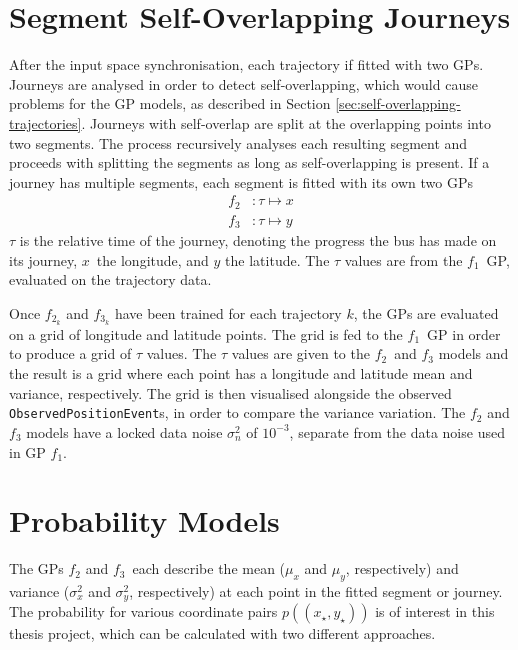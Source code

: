 \section{Segment Self-Overlapping Journeys} \label{sec:segment-self-overlapping-journeys}
After the input space synchronisation, each trajectory if fitted with two GPs.
Journeys are analysed in order to detect self-overlapping, which would cause problems for the GP models, as described in Section \ref{sec:self-overlapping-trajectories}.
Journeys with self-overlap are split at the overlapping points into two segments.
The process recursively analyses each resulting segment and proceeds with splitting the segments as long as self-overlapping is present.
If a journey has multiple segments, each segment is fitted with its own two GPs
\begin{align}
    f_2&: \tau \longmapsto x \\
    f_3&: \tau \longmapsto y
\end{align}
$\tau$ is the relative time of the journey, denoting the progress the bus has made on its journey, $x$ the longitude, and $y$ the latitude.
The $\tau$ values are from the $f_1$ GP, evaluated on the trajectory data.

Once $f_{2_k}$ and $f_{3_k}$ have been trained for each trajectory $k$, the GPs are evaluated on a grid of longitude and latitude points.
The grid is fed to the $f_1$ GP in order to produce a grid of $\tau$ values.
The $\tau$ values are given to the $f_2$ and $f_3$ models and the result is a grid where each point has a longitude and latitude mean and variance, respectively.
The grid is then visualised alongside the observed \texttt{ObservedPositionEvent}s, in order to compare the variance variation.
The $f_2$ and $f_3$ models have a locked data noise $\sigma^2_n$ of $10^{-3}$, separate from the data noise used in GP $f_1$.

\section{Probability Models} \label{sec:probability-models}
The GPs $f_2$ and $f_3$ each describe the mean ($\mu_x$ and $\mu_y$, respectively) and variance ($\sigma_x^2$ and $\sigma_y^2$, respectively) at each point in the fitted segment or journey.
The probability for various coordinate pairs $p((x_\star,y_\star))$ is of interest in this thesis project, which can be calculated with two different approaches.

